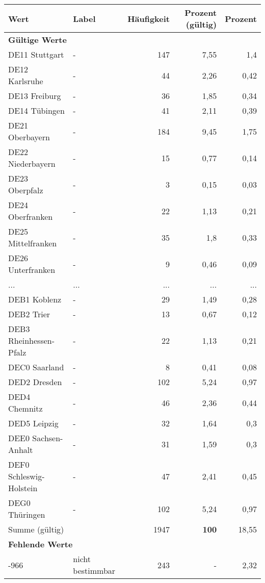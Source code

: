      \begin{longtable}{Xlrrr}
     \toprule
     \textbf{Wert} & \textbf{Label} & \textbf{Häufigkeit} & \textbf{Prozent (gültig)} & \textbf{Prozent} \\
     \endhead
     \midrule
     \multicolumn{5}{l}{\textbf{Gültige Werte}}\\
        \multicolumn{1}{X}{DE11 Stuttgart} & - & 147 & 7,55 & 1,4 \\
        \multicolumn{1}{X}{DE12 Karlsruhe} & - & 44 & 2,26 & 0,42 \\
        \multicolumn{1}{X}{DE13 Freiburg} & - & 36 & 1,85 & 0,34 \\
        \multicolumn{1}{X}{DE14 Tübingen} & - & 41 & 2,11 & 0,39 \\
        \multicolumn{1}{X}{DE21 Oberbayern} & - & 184 & 9,45 & 1,75 \\
        \multicolumn{1}{X}{DE22 Niederbayern} & - & 15 & 0,77 & 0,14 \\
        \multicolumn{1}{X}{DE23 Oberpfalz} & - & 3 & 0,15 & 0,03 \\
        \multicolumn{1}{X}{DE24 Oberfranken} & - & 22 & 1,13 & 0,21 \\
        \multicolumn{1}{X}{DE25 Mittelfranken} & - & 35 & 1,8 & 0,33 \\
        \multicolumn{1}{X}{DE26 Unterfranken} & - & 9 & 0,46 & 0,09 \\
       ... & ... & ... & ... & ... \\
        \multicolumn{1}{X}{DEB1 Koblenz} & - & 29 & 1,49 & 0,28 \\
        \multicolumn{1}{X}{DEB2 Trier} & - & 13 & 0,67 & 0,12 \\
        \multicolumn{1}{X}{DEB3 Rheinhessen-Pfalz} & - & 22 & 1,13 & 0,21 \\
        \multicolumn{1}{X}{DEC0 Saarland} & - & 8 & 0,41 & 0,08 \\
        \multicolumn{1}{X}{DED2 Dresden} & - & 102 & 5,24 & 0,97 \\
        \multicolumn{1}{X}{DED4 Chemnitz} & - & 46 & 2,36 & 0,44 \\
        \multicolumn{1}{X}{DED5 Leipzig} & - & 32 & 1,64 & 0,3 \\
        \multicolumn{1}{X}{DEE0 Sachsen-Anhalt} & - & 31 & 1,59 & 0,3 \\
        \multicolumn{1}{X}{DEF0 Schleswig-Holstein} & - & 47 & 2,41 & 0,45 \\
        \multicolumn{1}{X}{DEG0 Thüringen} & - & 102 & 5,24 & 0,97 \\
     \midrule
      \multicolumn{2}{l}{Summe (gültig)} & 1947 &
      \textbf{100} &
         18,55 \\
     \multicolumn{5}{l}{\textbf{Fehlende Werte}}\\
       -966 & nicht bestimmbar & 243 & - & 2,32 \\


\end{longtable}
